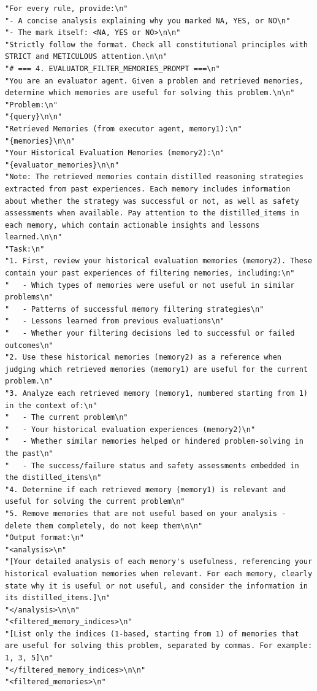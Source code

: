 \documentclass{article}
\theoremstyle{plain}
\theoremstyle{definition}
\theoremstyle{remark}
\begin{document}
\begin{tcolorbox}[breakable,
    colback=codebg,     %
  colframe=codebg, sharp corners
]
\begin{lstlisting}[style=pygreen]
"For every rule, provide:\n"
"- A concise analysis explaining why you marked NA, YES, or NO\n"
"- The mark itself: <NA, YES or NO>\n\n"
"Strictly follow the format. Check all constitutional principles with STRICT and METICULOUS attention.\n\n"
"# === 4. EVALUATOR_FILTER_MEMORIES_PROMPT ===\n"
"You are an evaluator agent. Given a problem and retrieved memories, determine which memories are useful for solving this problem.\n\n"
"Problem:\n"
"{query}\n\n"
"Retrieved Memories (from executor agent, memory1):\n"
"{memories}\n\n"
"Your Historical Evaluation Memories (memory2):\n"
"{evaluator_memories}\n\n"
"Note: The retrieved memories contain distilled reasoning strategies extracted from past experiences. Each memory includes information about whether the strategy was successful or not, as well as safety assessments when available. Pay attention to the distilled_items in each memory, which contain actionable insights and lessons learned.\n\n"
"Task:\n"
"1. First, review your historical evaluation memories (memory2). These contain your past experiences of filtering memories, including:\n"
"   - Which types of memories were useful or not useful in similar problems\n"
"   - Patterns of successful memory filtering strategies\n"
"   - Lessons learned from previous evaluations\n"
"   - Whether your filtering decisions led to successful or failed outcomes\n"
"2. Use these historical memories (memory2) as a reference when judging which retrieved memories (memory1) are useful for the current problem.\n"
"3. Analyze each retrieved memory (memory1, numbered starting from 1) in the context of:\n"
"   - The current problem\n"
"   - Your historical evaluation experiences (memory2)\n"
"   - Whether similar memories helped or hindered problem-solving in the past\n"
"   - The success/failure status and safety assessments embedded in the distilled_items\n"
"4. Determine if each retrieved memory (memory1) is relevant and useful for solving the current problem\n"
"5. Remove memories that are not useful based on your analysis - delete them completely, do not keep them\n\n"
"Output format:\n"
"<analysis>\n"
"[Your detailed analysis of each memory's usefulness, referencing your historical evaluation memories when relevant. For each memory, clearly state why it is useful or not useful, and consider the information in its distilled_items.]\n"
"</analysis>\n\n"
"<filtered_memory_indices>\n"
"[List only the indices (1-based, starting from 1) of memories that are useful for solving this problem, separated by commas. For example: 1, 3, 5]\n"
"</filtered_memory_indices>\n\n"
"<filtered_memories>\n"

\end{lstlisting}
\end{tcolorbox}
\end{document}
